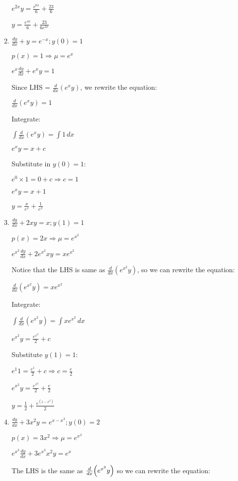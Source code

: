 \documentclass[../main.tex]{subfiles}
\begin{document}
\begin{enumerate}[itemsep=0.7cm]
    $e^{2x}y=\frac{e^{6x}}{6}+\frac{23}{6}$

    $y=\frac{e^{4x}}{6}+\frac{23}{6e^{2x}}$


    \item 
    $\frac{dy}{dx}+y=e^{-x}; y(0)=1$

    $p(x)=1 \Rightarrow \mu=e^x$

    $e^x \frac{dy}{dx}+e^x y=1$

    Since LHS = $\frac{d}{dx}(e^x y)$, we rewrite the equation:

    $\frac{d}{dx}(e^x y)=1$

    Integrate:

    $\int \frac{d}{dx}(e^x y)=\int 1\,dx$

    $e^x y=x+c$

    Substitute in $y(0)=1$:

    $e^0 \times 1=0+c \Rightarrow c=1$

    $e^x y = x+1$

    $y=\frac{x}{e^x}+\frac{1}{e^{x}}$

    \item 
    $\frac{dy}{dx}+2xy=x; y(1)=1$

    $p(x)=2x \Rightarrow \mu=e^{x^2}$

    $e^{x^2}\frac{dy}{dx}+2e^{x^2}xy=xe^{x^2}$

    Notice that the LHS is same as $\frac{d}{dx}(e^{x^2}y)$, so we can rewrite the equation:

    $\frac{d}{dx}(e^{x^2}y)=xe^{x^2}$

    Integrate:

    $\int \frac{d}{dx}(e^{x^2}y)=\int xe^{x^2}\,dx$

    $e^{x^2}y=\frac{e^{x^2}}{2}+c$

    Substitute $y(1)=1$:

    $e^{1}1=\frac{e^{1}}{2}+c \Rightarrow c=\frac{e}{2}$

    $e^{x^2}y=\frac{e^{x^2}}{2}+\frac{e}{2}$

    $y=\frac{1}{2}+\frac{e^{(1-x^2)}}{2}$

    \item 
    $\frac{dy}{dx}+3x^2 y=e^{x-x^3}; y(0)=2$

    $p(x)=3x^2 \Rightarrow \mu=e^{x^3}$

    $e^{x^3}\frac{dy}{dx}+3e^{x^3}x^2 y=e^{x}$

    The LHS is the same as $\frac{d}{dx}\Bigl(e^{x^3}y\Bigr)$ so we can rewrite the equation:


\end{enumerate}
\end{document}
